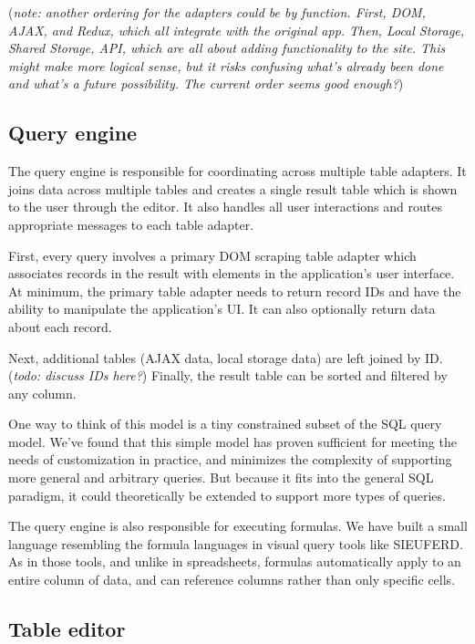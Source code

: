 \documentclass[sigplan,10pt,anonymous,review]{acmart}
\begin{document}
(\emph{note: another ordering for the adapters could be by function.
First, DOM, AJAX, and Redux, which all integrate with the original app.
Then, Local Storage, Shared Storage, API, which are all about adding
functionality to the site. This might make more logical sense, but it
risks confusing what's already been done and what's a future
possibility. The current order seems good enough?})

\hypertarget{query-engine}{%
\subsection{Query engine}\label{query-engine}}

The query engine is responsible for coordinating across multiple table
adapters. It joins data across multiple tables and creates a single
result table which is shown to the user through the editor. It also
handles all user interactions and routes appropriate messages to each
table adapter.

First, every query involves a primary DOM scraping table adapter which
associates records in the result with elements in the application's user
interface. At minimum, the primary table adapter needs to return record
IDs and have the ability to manipulate the application's UI. It can also
optionally return data about each record.

Next, additional tables (AJAX data, local storage data) are left joined
by ID. (\emph{todo: discuss IDs here?}) Finally, the result table can be
sorted and filtered by any column.

One way to think of this model is a tiny constrained subset of the SQL
query model. We've found that this simple model has proven sufficient
for meeting the needs of customization in practice, and minimizes the
complexity of supporting more general and arbitrary queries. But because
it fits into the general SQL paradigm, it could theoretically be
extended to support more types of queries.

The query engine is also responsible for executing formulas. We have
built a small language resembling the formula languages in visual query
tools like SIEUFERD. As in those tools, and unlike in spreadsheets,
formulas automatically apply to an entire column of data, and can
reference columns rather than only specific cells.

\hypertarget{table-editor}{%
\subsection{Table editor}\label{table-editor}}
\end{document}
